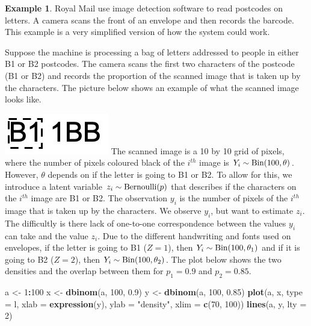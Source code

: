 \documentclass[
]{book}
\newenvironment{Shaded}{\begin{snugshade}}{\end{snugshade}}
\newcommand{\AttributeTok}[1]{\textcolor[rgb]{0.13,0.29,0.53}{#1}}
\newcommand{\DecValTok}[1]{\textcolor[rgb]{0.00,0.00,0.81}{#1}}
\newcommand{\FloatTok}[1]{\textcolor[rgb]{0.00,0.00,0.81}{#1}}
\newcommand{\FunctionTok}[1]{\textcolor[rgb]{0.13,0.29,0.53}{\textbf{#1}}}
\newcommand{\NormalTok}[1]{#1}
\newcommand{\OtherTok}[1]{\textcolor[rgb]{0.56,0.35,0.01}{#1}}
\newcommand{\SpecialCharTok}[1]{\textcolor[rgb]{0.81,0.36,0.00}{\textbf{#1}}}
\newcommand{\StringTok}[1]{\textcolor[rgb]{0.31,0.60,0.02}{#1}}
\theoremstyle{definition}
\theoremstyle{definition}
\newtheorem{example}{Example}[chapter]
\theoremstyle{definition}
\theoremstyle{definition}
\theoremstyle{remark}
\begin{document}
\begin{example}
Royal Mail use image detection software to read postcodes on letters. A camera scans the front of an envelope and then records the barcode. This example is a very simplified version of how the system could work.

Suppose the machine is processing a bag of letters addressed to people in either B1 or B2 postcodes. The camera scans the first two characters of the postcode (B1 or B2) and records the proportion of the scanned image that is taken up by the characters. The picture below shows an example of what the scanned image looks like.

\includegraphics{postcode.jpeg}
The scanned image is a 10 by 10 grid of pixels, where the number of pixels coloured black of the \(i^{th}\) image is \(Y_i \sim \hbox{Bin}(100, \theta)\). However, \(\theta\) depends on if the letter is going to B1 or B2. To allow for this, we introduce a latent variable \(z_i \sim \hbox{Bernoulli}(p)\) that describes if the characters on the \(i^{th}\) image are B1 or B2. The observation \(y_i\) is the number of pixels of the \(i^{th}\) image that is taken up by the characters. We observe \(y_i\), but want to estimate \(z_i\). The difficultly is there lack of one-to-one correspondence between the values \(y_i\) can take and the value \(z_i\). Due to the different handwriting and fonts used on envelopes, if the letter is going to B1 (\(Z = 1\)), then \(Y_i \sim \hbox{Bin}(100, \theta_1)\) and if it is going to B2 (\(Z = 2\)), then \(Y_i \sim \hbox{Bin}(100, \theta_2)\). The plot below shows the two densities and the overlap between them for \(p_1 = 0.9\) and \(p_2 = 0.85\).

\begin{Shaded}
\begin{Highlighting}[]
\NormalTok{a }\OtherTok{\textless{}{-}} \DecValTok{1}\SpecialCharTok{:}\DecValTok{100}
\NormalTok{x }\OtherTok{\textless{}{-}} \FunctionTok{dbinom}\NormalTok{(a, }\DecValTok{100}\NormalTok{, }\FloatTok{0.9}\NormalTok{)}
\NormalTok{y }\OtherTok{\textless{}{-}}  \FunctionTok{dbinom}\NormalTok{(a, }\DecValTok{100}\NormalTok{, }\FloatTok{0.85}\NormalTok{)}
\FunctionTok{plot}\NormalTok{(a, x, }\AttributeTok{type =} \StringTok{\textquotesingle{}l\textquotesingle{}}\NormalTok{, }\AttributeTok{xlab =} \FunctionTok{expression}\NormalTok{(y),}
     \AttributeTok{ylab =} \StringTok{"density"}\NormalTok{, }\AttributeTok{xlim =} \FunctionTok{c}\NormalTok{(}\DecValTok{70}\NormalTok{, }\DecValTok{100}\NormalTok{))}
\FunctionTok{lines}\NormalTok{(a, y, }\AttributeTok{lty =} \DecValTok{2}\NormalTok{)}
\end{Highlighting}
\end{Shaded}


\end{example}
\end{document}
